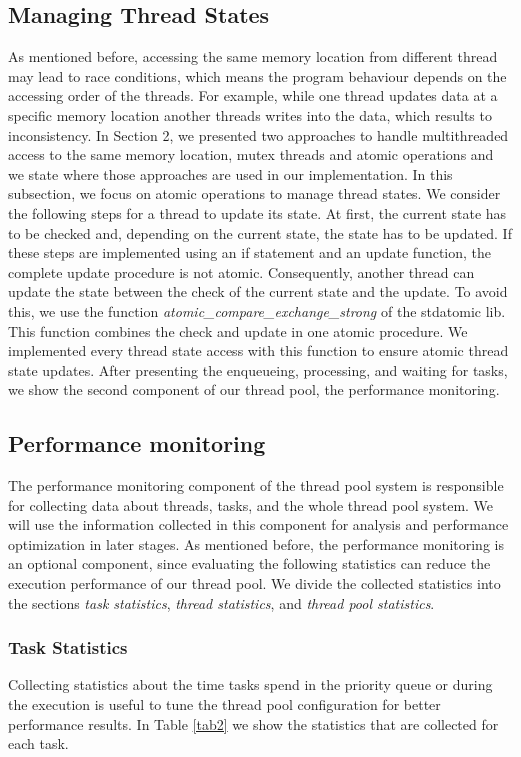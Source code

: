 \documentclass[conference]{IEEEtran}
\begin{document}
\subsection{Managing Thread States}
As mentioned before, accessing the same memory location from different thread may lead to race conditions, which means the program behaviour depends on the accessing order of the threads. For example, while one thread updates data at a specific memory location another threads writes into the data, which results to inconsistency. In Section 2, we presented two approaches to handle multithreaded access to the same memory location, mutex threads and atomic operations and we state where those approaches are used in our implementation. In this subsection, we focus on atomic operations to manage thread states. We consider the following steps for a thread to update its state. At first, the current state has to be checked and, depending on the current state, the state has to be updated. If these steps are implemented using an if statement and an update function, the complete update procedure is not atomic. Consequently, another thread can update the state between the check of the current state and the update. To avoid this, we use the function \emph{atomic\_compare\_exchange\_strong} \cite{atomicstrong} of the stdatomic lib. This function combines the check and update in one atomic procedure. We implemented every thread state access with this function to ensure atomic thread state updates. After presenting the enqueueing, processing, and waiting for tasks, we show the second component of our thread pool, the performance monitoring.

\subsection{Performance monitoring}
The performance monitoring component of the thread pool system is responsible for collecting data about threads, tasks, and the whole thread pool system. We will use the information collected in this component for analysis and performance optimization in later stages. As mentioned before, the performance monitoring is an optional component, since evaluating the following statistics can reduce the execution performance of our thread pool. We divide the collected statistics into the sections \emph{task statistics}, \emph{thread statistics}, and \emph{thread pool statistics}.

\subsubsection{Task Statistics}
Collecting statistics about the time tasks spend in the priority queue or during the execution is useful to tune the thread pool configuration for better performance results. In Table \ref{tab2} we show the statistics that are collected for each task. 
\end{document}
